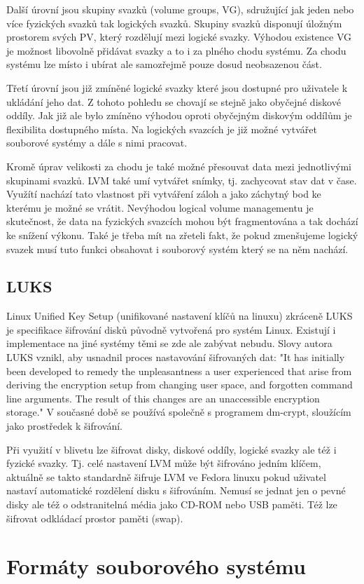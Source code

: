 \documentclass[color,table,oneside,nolot,nolof]{fithesis}
\begin{document}
	Další úrovní jsou skupiny svazků (volume groups, VG), sdružující jak jeden nebo více fyzických svazků tak logických svazků. Skupiny svazků disponují úložným prostorem svých PV, který 
  rozdělují mezi logické svazky. Výhodou existence VG je možnost libovolně přidávat svazky a to i za plného chodu systému. Za chodu systému lze místo i ubírat ale samozřejmě
	pouze dosud neobsazenou část. 

	Třetí úrovní jsou již zmíněné logické svazky které jsou dostupné pro uživatele k ukládání jeho dat. Z tohoto pohledu se chovají se stejně jako obyčejné diskové oddíly. Jak již ale
	bylo zmíněno výhodou oproti obyčejným diskovým oddílům je flexibilita dostupného místa. Na logických svazcích je již možné vytvářet souborové systémy a dále s nimi pracovat.

	Kromě úprav velikosti za chodu je také možné přesouvat data mezi jednotlivými skupinami svazků. LVM také umí vytvářet snímky, tj. zachycovat stav dat v čase. Využítí nachází tato vlastnost
	při vytváření záloh a jako záchytný bod ke kterému je možné se vrátit. Nevýhodou logical volume managementu je skutečnost, že data na fyzických svazcích mohou být fragmentována a tak
	dochází ke snížení výkonu. Také je třeba mít na zřeteli fakt, že pokud zmenšujeme logický svazek musí tuto funkci obsahovat i souborový systém který se na něm nachází.

\subsection{LUKS}
	Linux Unified Key Setup (unifikované nastavení klíčů na linuxu) zkráceně LUKS je specifikace šifrování disků původně vytvořená pro systém Linux. Existují i implementace na jiné systémy
	těmi se zde ale zabývat nebudu. Slovy autora LUKS vznikl, aby usnadnil proces nastavování šifrovaných dat: "It has initially been developed to remedy the unpleasantness a user 
	experienced that arise from deriving the encryption setup from changing user space, and forgotten command line arguments. The result of this changes are an unaccessible encryption
	storage."\cite{on-disk-format} V současné době se používá společně s programem dm-crypt, sloužícím jako prostředek k šifrování.

	Při využití v blivetu lze šifrovat disky, diskové oddíly, logické svazky ale též i fyzické svazky. Tj. celé nastavení LVM může být šifrováno jedním klíčem, aktuálně se takto 
	standardně šifruje LVM ve Fedora linuxu pokud uživatel nastaví automatické rozdělení disku s šifrováním. Nemusí se jednat jen o pevné disky ale též o odstranitelná média jako
	CD-ROM nebo USB paměti. Též lze šifrovat odkládací prostor paměti (swap).

\section{Formáty souborového systému}
















	\printbibliography
\end{document}
